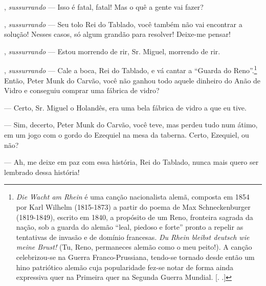 \begin{myparindent}{0pt}
\begin{Parskip}
, \emph{sussurrando} --- Isso é fatal, fatal! Mas o quê a
gente vai fazer?

, \emph{sussurrando} --- Seu tolo Rei do Tablado, você
também não vai encontrar a solução! Nesses casos, só algum grandão para
resolver! Deixe-me pensar!

, \emph{sussurrando} --- Estou morrendo de rir, Sr. Miguel,
morrendo de rir.

, \emph{sussurrando} --- Cale a boca, Rei do Tablado, e
vá cantar a ``Guarda do Reno''.\footnote{\emph{Die Wacht am Rhein} é uma
  canção nacionalista alemã, composta em 1854 por Karl Wilhelm
  (1815-1873) a partir do poema de Max Schneckenburger (1819-1849),
  escrito em 1840, a propósito de um Reno, fronteira sagrada da nação,
  sob a guarda do alemão ``leal, piedoso e forte'' pronto a repelir as
  tentativas de invasão e de domínio francesas. \emph{Du Rhein bleibst
  deutsch wie meine Brust!} (Tu, Reno, permaneces alemão como o meu
  peito!). A canção celebrizou-se na Guerra Franco-Prussiana, tendo-se
  tornado desde então um hino patriótico alemão cuja popularidade fez-se
  notar de forma ainda expressiva quer na Primeira quer na Segunda
  Guerra Mundial. [. .]} Então, Peter Munk do Carvão, você não
ganhou todo aquele dinheiro do Anão de Vidro e conseguiu comprar uma
fábrica de vidro?

 --- Certo, Sr. Miguel o Holandês, era uma bela
fábrica de vidro a que eu tive.

 --- Sim, decerto, Peter Munk do Carvão, você teve, mas
perdeu tudo num átimo, em um jogo com o gordo do Ezequiel na mesa da
taberna. Certo, Ezequiel, ou não?

 --- Ah, me deixe em paz com essa história, Rei do Tablado, nunca
mais quero ser lembrado dessa história!


\end{Parskip}
\end{myparindent}

